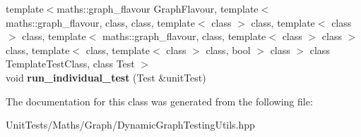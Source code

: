\begin{DoxyCompactItemize}
\item 
\mbox{\label{classsequoia_1_1unit__testing_1_1graph__test__helper_a5001821655181e208e0b2048bf6754c3}} 
{\footnotesize template$<$maths\+::graph\+\_\+flavour Graph\+Flavour, template$<$ maths\+::graph\+\_\+flavour, class, class, template$<$ class $>$ class, template$<$ class $>$ class, template$<$ maths\+::graph\+\_\+flavour, class, template$<$ class $>$ class $>$ class, template$<$ class, template$<$ class $>$ class, bool $>$ class $>$ class Template\+Test\+Class, class Test $>$ }\\void {\bfseries run\+\_\+individual\+\_\+test} (Test \&unit\+Test)
\end{DoxyCompactItemize}


The documentation for this class was generated from the following file\+:\begin{DoxyCompactItemize}
\item 
Unit\+Tests/\+Maths/\+Graph/Dynamic\+Graph\+Testing\+Utils.\+hpp\end{DoxyCompactItemize}
